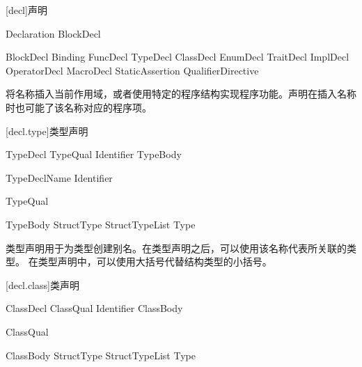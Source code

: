 
[decl]{声明}

\begin{bnf}{Declaration}
    BlockDecl
\end{bnf}

\begin{bnf}{BlockDecl}
    Binding \br
    FuncDecl \br
    TypeDecl \br
    ClassDecl \br
    EnumDecl \br
    TraitDecl \br
    ImplDecl \br
    OperatorDecl \br
    MacroDecl \br
    StaticAssertion \br
    QualifierDirective
\end{bnf}

\pnum
{}将名称插入当前作用域，或者使用特定的程序结构实现程序功能。声明在插入名称时也可能了该名称对应的程序项。

[decl.type]{类型声明}

\begin{bnf}{TypeDecl}
    TypeQual\bnfs {} Identifier TypeBody
\end{bnf}

\begin{bnf}{TypeDeclName}
    Identifier \br
\end{bnf}

\begin{bnf}{TypeQual}
\end{bnf}

\begin{bnf}{TypeBody}
    StructType \br
    \terminal{\{} \terminal{\}} \br
    \terminal{\{} StructTypeList \terminal{,}\bnfq \terminal{\}} \br
    \terminal{=} Type
\end{bnf}

\pnum
类型声明用于为类型创建别名。在类型声明之后，可以使用该名称代表所关联的类型。
在类型声明中，可以使用大括号代替结构类型的小括号。

[decl.class]{类声明}

\begin{bnf}{ClassDecl}
    ClassQual\bnfs {} Identifier ClassBody
\end{bnf}

\begin{bnf}{ClassQual}
\end{bnf}

\begin{bnf}{ClassBody}
    StructType \br
    \terminal{\{} \terminal{\}} \br
    \terminal{\{} StructTypeList \terminal{,}\bnfq \terminal{\}} \br
    \terminal{=} Type
\end{bnf}

